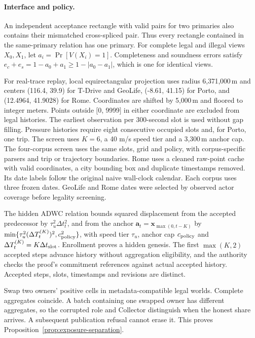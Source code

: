 \documentclass[conference,compsoc]{IEEEtran}
\theoremstyle{definition}
\numberwithin{equation}{section}
\numberwithin{table}{section}
\numberwithin{figure}{section}
\theoremstyle{plain}
\begin{document}
\paragraph{Interface and policy.}
\label{cor:submission-shared-tag}
An independent acceptance rectangle with valid pairs for two primaries also
contains their mismatched cross-spliced pair. Thus every rectangle contained in
the same-primary relation has one primary.
\label{sec:history-interface}
For complete legal and illegal views \(X_0,X_1\), let
\(a_i=\Pr[V(X_i)=1]\). Completeness and soundness errors satisfy
\(e_c+e_s=1-a_0+a_1\ge1-|a_0-a_1|\), which is one for identical views.

\label{app:policy}
For real-trace replay, local equirectangular projection uses radius
6,371,000\,m and centers (116.4, 39.9) for T-Drive and GeoLife, (-8.61, 41.15) for Porto, and (12.4964, 41.9028) for Rome. Coordinates are shifted by 5,000\,m and floored to integer meters.
Points outside [0, 9999] in either coordinate are excluded from legal histories.
The earliest observation per 300-second slot is used without gap filling.
Pressure histories require eight consecutive occupied slots and, for Porto,
one trip. The screen uses \(K=6\), a 40 m/s speed tier and a 3,300\,m anchor cap. The four-corpus screen uses the same slots, grid and policy, with corpus-specific parsers and trip or trajectory boundaries. Rome uses a cleaned raw-point cache with valid coordinates, a city bounding box and duplicate timestamps removed. Its date labels follow the original naive wall-clock calendar. Each corpus uses three frozen dates. GeoLife and Rome dates were selected by observed actor coverage before legality screening.

The hidden ADWC relation bounds squared displacement from the accepted
predecessor by \(\tau_u^2\Delta t_t^2\), and from the anchor
\(\mathbf a_t=\mathbf x_{\max(0,t-K)}\) by
\(\min\{\tau_u^2(\Delta T_t^{(K)})^2,c_{\rm policy}^2\}\), with speed tier
\(\tau_u\), anchor cap \(c_{\rm policy}\) and
\(\Delta T_t^{(K)}=K\Delta t_{\rm slot}\). Enrollment proves a hidden
genesis. The first \(\max(K,2)\) accepted steps advance history without
aggregation eligibility, and the authority checks the proof's commitment
references against actual accepted history. Accepted steps, slots,
timestamps and revisions are distinct.

\label{app:exposure-separation}
Swap two owners' positive cells in metadata-compatible legal worlds.
Complete aggregates coincide. A batch containing one swapped owner has
different aggregates, so the corrupted role and Collector distinguish when
the honest share arrives. A subsequent publication refusal cannot erase it.
This proves Proposition~\ref{prop:exposure-separation}.
\end{document}
